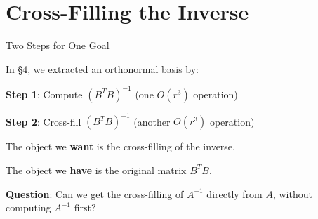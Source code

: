 \documentclass[10pt]{beamer}
\theoremstyle{definition}
\newcommand{\x}[1]{\alert{\textbf{#1}}}
\begin{document}
\section{Cross-Filling the Inverse}


\begin{frame}{Two Steps for One Goal}

In \S4, we extracted an orthonormal basis by:

\vspace{0.3em}

\x{Step 1}: Compute $(B^TB)^{-1}$ \quad (one $O(r^3)$ operation)

\x{Step 2}: Cross-fill $(B^TB)^{-1}$ \quad (another $O(r^3)$ operation)

\vspace{0.5em}

The object we \x{want} is the cross-filling of the inverse.

The object we \x{have} is the original matrix $B^TB$.

\vspace{0.5em}

\x{Question}: Can we get the cross-filling of $A^{-1}$ directly from $A$, without computing $A^{-1}$ first?

\end{frame}
\end{document}

